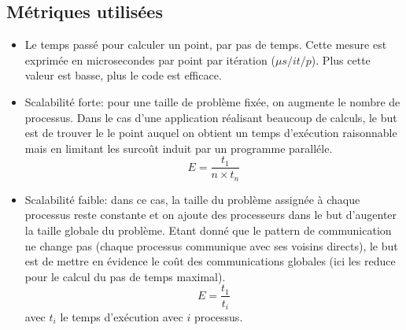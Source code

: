 
\subsection{Métriques utilisées}
\begin{itemize}
\item Le temps passé pour calculer un point, par pas de temps. Cette mesure est exprimée en microsecondes par point par itération ($\mu s/it/p$). Plus cette valeur est basse, plus le code est efficace. 


\item Scalabilité forte: pour une taille de problème fixée, on augmente le nombre de processus. Dans le cas d'une application réalisant beaucoup de calculs, le but est de trouver le le point auquel on obtient un temps d'exécution raisonnable mais en limitant les surcoût induit par un programme paralléle.
$$E=\frac{t_1}{n\times t_n}$$
\item Scalabilité faible: dans ce cas, la taille du problème assignée à chaque processus reste constante et on ajoute des processeurs dans le but d'augenter la taille globale du problème. Etant donné que le pattern de communication ne change pas (chaque processus communique avec ses voisins directs), le but est de mettre en évidence le coût des communications globales (ici les reduce pour le calcul du pas de temps maximal).
$$E=\frac{t_1}{t_i}$$ avec $t_i$ le temps d'exécution avec $i$ processus.


\end{itemize}




